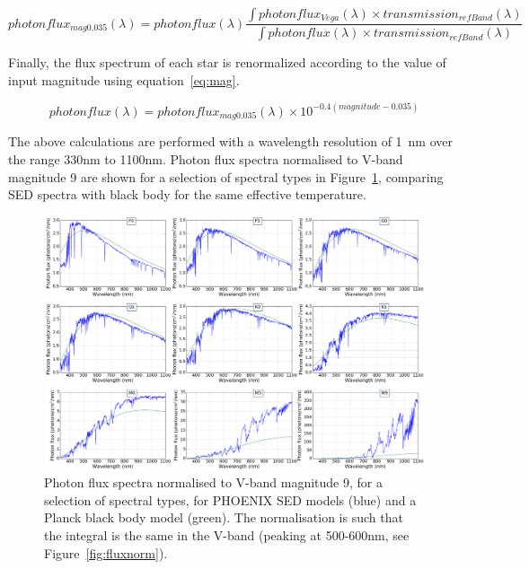 \documentclass[11pt]{article}      %
\begin{document}
\begin{equation}
photonflux_{mag0.035}(\lambda) = photonflux(\lambda)\frac{\int photonflux_{Vega}(\lambda) \times transmission_{refBand}(\lambda)}{\int photonflux(\lambda) \times transmission_{refBand}(\lambda)}
\label{eq:fluxnorm}
\end{equation}

Finally, the flux spectrum of each star is renormalized according to the value of input magnitude using equation~\ref{eq:mag}.

\begin{equation}
photonflux(\lambda) = photonflux_{mag0.035}(\lambda) \times 10^{-0.4 (magnitude-0.035)}
\label{eq:mag}
\end{equation}

The above calculations are performed with a wavelength resolution of 1~nm over the range 330nm to 1100nm. Photon flux spectra normalised to V-band magnitude 9 are shown for a selection of spectral types in Figure~\ref{fig:seds}, comparing SED spectra with black body for the same effective temperature.

\begin{figure}[hbtp]
  \begin{center}
    \includegraphics[width=\textwidth]{SEDs.png}
    \caption{Photon flux spectra normalised to V-band magnitude 9, for a selection of spectral types, for PHOENIX SED models (blue) and a Planck black body model (green). The normalisation is such that the integral is the same in the V-band (peaking at 500-600nm, see Figure~\ref{fig:fluxnorm}).}
    \label{fig:seds}
  \end{center}
\end{figure}
\end{document}

